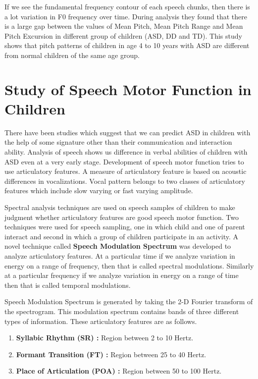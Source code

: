\documentclass[11pt]{report}
\begin{document}
If we see the fundamental frequency contour of each speech chunks, then there is a lot variation in F0 frequency over time. During analysis they found that there is a large gap between the values of Mean Pitch, Mean Pitch Range and Mean Pitch Excursion in different group of children (ASD, DD and TD). This study shows that pitch patterns of children in age 4 to 10 years with ASD are different from normal children of the same age group.



\section{Study of Speech Motor Function in Children}
There have been studies which suggest that we can predict ASD in children with the help of some signature other than their communication and interaction ability. Analysis of speech shows us difference in verbal abilities of children with ASD even at a very early stage. Development of speech motor function \cite{motor} tries to use articulatory features. A measure of articulatory feature is based on acoustic differences in vocalizations. Vocal pattern belongs to two classes of articulatory features which include slow varying or fast varying amplitude.


Spectral analysis techniques are used on speech samples of children to make judgment whether articulatory features are good speech motor function. Two techniques were used for speech sampling, one in which child and one of parent interact and second in which a group of children participate in an activity. A novel technique called \textbf{Speech Modulation Spectrum} was developed to analyze articulatory features. At a particular time if we analyze variation in energy on a range of frequency, then that is called spectral modulations. Similarly at a particular frequency if we analyze variation in energy on a range of time then that is called temporal modulations.


Speech Modulation Spectrum is generated by taking the 2-D Fourier transform of the spectrogram. This modulation spectrum contains bands of three different types of information. These articulatory features \cite{arti} are as follows.
\begin{enumerate}
\item \textbf{Syllabic Rhythm (SR) :} Region between 2 to 10 Hertz. 
\item \textbf{Formant Transition (FT) :} Region between 25 to 40 Hertz.
\item \textbf{Place of Articulation (POA) :} Region between 50 to 100 Hertz.
\end{enumerate} 
\end{document}
